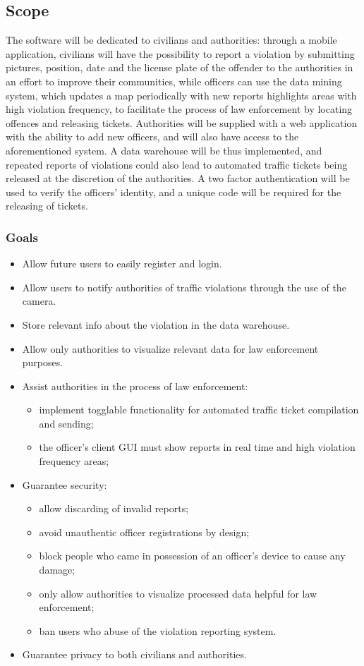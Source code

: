 \documentclass[12pt,a4paper]{article}
\begin{document}
\subsection{Scope}
The software will be dedicated to civilians and authorities: through a mobile application, civilians will have the possibility to report a violation by submitting pictures, position, date and the license plate of the offender to the authorities in an effort to improve their communities, while officers can use the data mining system, which updates a map periodically with new reports  highlights areas with high violation frequency, to facilitate the process of law enforcement by locating offences and releasing tickets. Authorities will be supplied with a web application with the ability to add new officers, and will also have access to the aforementioned system.
A data warehouse will be thus implemented, and repeated reports of violations could also lead to automated traffic tickets being released at the discretion of the authorities.
A two factor authentication will be used to verify the officers' identity, and a unique code will be required for the releasing of tickets.
\subsubsection{Goals}
\begin{itemize}
\item Allow future users to easily register and login. 
\item Allow users to notify authorities of traffic violations through the use of the camera.
\item Store relevant info about the violation in the data warehouse.
\item Allow only authorities to visualize relevant data for law enforcement purposes.
\item Assist authorities in the process of law enforcement:
\begin{itemize}
	\item implement togglable functionality for automated traffic ticket compilation and sending;
	\item the officer's client GUI must show reports in real time and high violation frequency areas;
\end{itemize}
\item Guarantee security: 
\begin{itemize}
	\item allow discarding of invalid reports;
	\item avoid unauthentic officer registrations by design;
	\item block people who came in possession of an officer's device to cause any damage;
    \item only allow authorities to visualize processed data helpful for law enforcement;
	\item ban users who abuse of the violation reporting system.
\end{itemize}
\item Guarantee privacy to both civilians and authorities.
\end{itemize}
\end{document}
